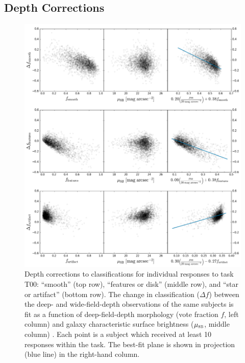 \documentclass[useAMS,usenatbib]{mn2e}
\def\musb       {$\mu_{\rm{\textsc{sb}}}$}
\begin{document}
{\subsection{Depth Corrections}\label{sec:depth}


\begin{figure}
\includegraphics[scale=0.5]{depthcorr_plane_2d_t00.png}
\caption{
Depth corrections to classifications for individual responses to task T00: ``smooth'' (top row), ``features or disk'' (middle row), and ``star or artifact'' (bottom row). The change in classification ($\Delta f$) between the deep- and wide-field-depth observations of the same subjects is fit as a function of deep-field-depth morphology (vote fraction $f$, left column) and galaxy characteristic surface brightness (\musb , middle column) . Each point is a subject which received at least 10 responses within the task. The best-fit plane is shown in projection (blue line) in the right-hand column. 
}
\label{fig:depthcorr}
\end{figure}



}
\end{document}
